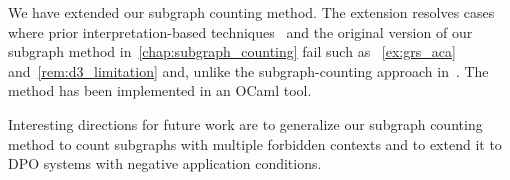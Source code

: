 We have extended our subgraph counting method.
The extension resolves cases where prior interpretation-based techniques~\cite{zantema2014termination,bruggink2014termination,bruggink2015proving,endrullis2024generalized_arxiv_v2,overbeek2024termination_lmcs}
and the original version of our subgraph method in~\autoref{chap:subgraph_counting}
fail such as ~\autoref{ex:grs_aca} and~\autoref{rem:d3_limitation} and, unlike the subgraph-counting approach in~\cite{overbeek2024termination_lmcs}.
The method has been implemented in an OCaml tool.

Interesting directions for future work are to generalize our subgraph counting method to count subgraphs with multiple forbidden contexts and to
 extend it to DPO systems with negative application conditions.